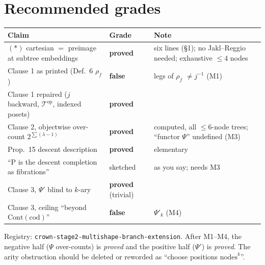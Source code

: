 \documentclass[11pt]{article}
\newcommand{\nodes}{\mathrm{nodes}}
\newcommand{\Cont}{\mathrm{Cont}}
\begin{document}
\section{Recommended grades}
\begin{center}\small
\begin{tabular}{p{6.2cm}p{2.6cm}p{6.4cm}}
\toprule
Claim & Grade & Note\\\midrule
$(\ast)$ cartesian $=$ preimage at subtree embeddings & \textbf{proved} & six lines (\S1); no
Jakl--Reggio needed; exhaustive $\le4$ nodes\\
Clause 1 as printed (Def.~6 $\rho_f$) & \textbf{false} & legs of $\rho_f$ $\ne j^{-1}$ (M1)\\
Clause 1 repaired ($j$ backward, $\mathcal T^{\mathrm{op}}$, indexed posets) & \textbf{proved} & \\
Clause 2, objectwise over-count $2^{\sum(\lambda-1)}$ & \textbf{proved} & computed, all
$\le6$-node trees; ``functor $\Psi$'' undefined (M3)\\
Prop.~15 descent description & \textbf{proved} & elementary\\
``P is the descent completion as fibrations'' & sketched & as you say; needs M3\\
Clause 3, $\Psi'$ blind to $k$-ary & \textbf{proved} (trivial) & \\
Clause 3, ceiling ``beyond $\Cont(\mathrm{cod})$'' & \textbf{false} & $\Psi'_k$ (M4)\\
\bottomrule
\end{tabular}
\end{center}
Registry: \texttt{crown-stage2-multishape-branch-extension}. After M1--M4, the negative half
($\Psi$ over-counts) is \emph{proved} and the positive half ($\Psi'$) is \emph{proved}. The arity
obstruction should be deleted or reworded as ``choose positions $\nodes^k$''.
\end{document}
